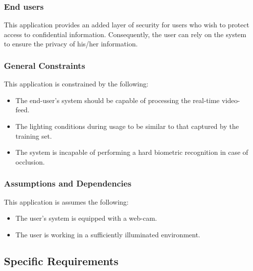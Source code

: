 \documentclass[12pt]{article}			%
\begin{document}
\subsubsection{ End users }
This application provides an added layer of security for users who wish to protect access to confidential information. Consequently, the user can rely on the system to ensure the privacy of his/her information.

\subsubsection{ General Constraints }
This application is constrained by the following:
\begin{itemize}
	\item The end-user's system should be capable of processing the real-time video-feed.
	\item The lighting conditions during usage to be similar to that captured by the training set.
	\item The system is incapable of performing a hard biometric recognition in case of occlusion.
\end{itemize}

\subsubsection{ Assumptions and Dependencies }
This application is assumes the following:
\begin{itemize}
	\item The user's system is equipped with a web-cam.
	\item The user is working in a sufficiently illuminated environment.
\end{itemize}

\subsection{ Specific Requirements }
\end{document}
